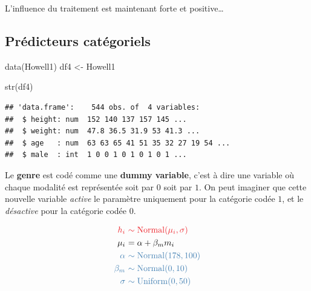 \documentclass[
  a4paper,11pt,twoside,onecolumn,openright,final,oldfontcommands]{memoir}
\newenvironment{Shaded}{\begin{snugshade}}{\end{snugshade}}
\newcommand{\FunctionTok}[1]{\textcolor[rgb]{0.00,0.00,0.00}{#1}}
\newcommand{\NormalTok}[1]{#1}
\newcommand{\OtherTok}[1]{\textcolor[rgb]{0.56,0.35,0.01}{#1}}
\theoremstyle{definition}
\theoremstyle{definition}
\theoremstyle{definition}
\theoremstyle{remark}
\begin{document}
L'influence du traitement est maintenant forte et positive\ldots{}

\hypertarget{pruxe9dicteurs-catuxe9goriels}{%
\subsection{Prédicteurs catégoriels}\label{pruxe9dicteurs-catuxe9goriels}}

\begin{Shaded}
\begin{Highlighting}[]
\FunctionTok{data}\NormalTok{(Howell1)}
\NormalTok{df4 }\OtherTok{\textless{}{-}}\NormalTok{ Howell1}

\FunctionTok{str}\NormalTok{(df4)}
\end{Highlighting}
\end{Shaded}

\begin{verbatim}
## 'data.frame':    544 obs. of  4 variables:
##  $ height: num  152 140 137 157 145 ...
##  $ weight: num  47.8 36.5 31.9 53 41.3 ...
##  $ age   : num  63 63 65 41 51 35 32 27 19 54 ...
##  $ male  : int  1 0 0 1 0 1 0 1 0 1 ...
\end{verbatim}

Le \textbf{genre} est codé comme une \textbf{dummy variable}, c'est à dire une variable où chaque modalité est représentée soit par \(0\) soit par \(1\). On peut imaginer que cette nouvelle variable \emph{active} le paramètre uniquement pour la catégorie codée \(1\), et le \emph{désactive} pour la catégorie codée \(0\).

\[
\begin{aligned}
\color{orangered}{h_{i}} \ &\color{orangered}{\sim \mathrm{Normal}(\mu_{i}, \sigma)} \\
\color{black}{\mu_{i}} \ &\color{black}{= \alpha + \beta_{m}m_{i}} \\
\color{steelblue}{\alpha} \ &\color{steelblue}{\sim \mathrm{Normal}(178, 100)} \\
\color{steelblue}{\beta_{m}} \ &\color{steelblue}{\sim \mathrm{Normal}(0, 10)} \\
\color{steelblue}{\sigma} \ &\color{steelblue}{\sim \mathrm{Uniform}(0, 50)}
\end{aligned}
\]
\end{document}
